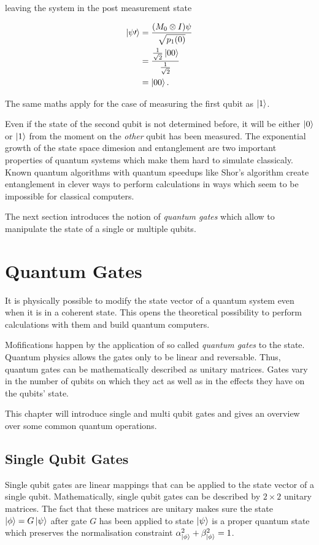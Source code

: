 leaving the system in the post measurement state

\begin{align}
  \Ket{\psi\prime} &= \frac{(M_0 \otimes I) \psi}{\sqrt{p_1(0)}} \\
                   &= \frac{\frac{1}{\sqrt{2}} \Ket{00}}{\frac{1}{\sqrt{2}}} \\
                   &= \Ket{00}.
\end{align}

The same maths apply for the case of measuring the first qubit as $\Ket{1}$.

Even if the state of the second qubit is not determined before, it will be
either $\Ket{0}$ or $\Ket{1}$ from the moment on the \textit{other} qubit has been measured.
The exponential growth of the state space dimesion and entanglement are two
important properties of quantum systems which make them hard to simulate
classicaly.
Known quantum algorithms with quantum speedups like Shor's algorithm
create entanglement in clever ways to perform calculations in ways which seem
to be impossible for classical computers.

The next section introduces the notion of \textit{quantum gates} which allow to
manipulate the state of a single or multiple qubits.

\section{Quantum Gates}

It is physically possible to modify the state vector of a quantum system even
when it is in a coherent state. This opens the theoretical possibility to perform
calculations with them and build quantum computers.

Mofifications happen by the application of so called \textit{quantum gates} to
the state. Quantum physics allows the gates only to be linear and reversable. Thus,
quantum gates can be mathematically described as unitary matrices. Gates vary in the number of
qubits on which they act as well as in the effects they have on the qubits' state.

This chapter will introduce single and multi qubit gates and gives an overview
over some common quantum operations.

\subsection{Single Qubit Gates}

Single qubit gates are linear mappings that can be applied to the state vector
of a single qubit. Mathematically, single qubit gates can be described by $2
\times 2$ unitary matrices. The fact that these matrices are unitary makes sure
the state $\Ket{\phi} = G \Ket{\psi}$ after gate $G$ has been applied to state $\Ket{\psi}$ is a
proper quantum state which preserves the normalisation constraint
$\alpha_{\Ket{\phi}}^2 + \beta_{\Ket{\phi}}^2 = 1$.

